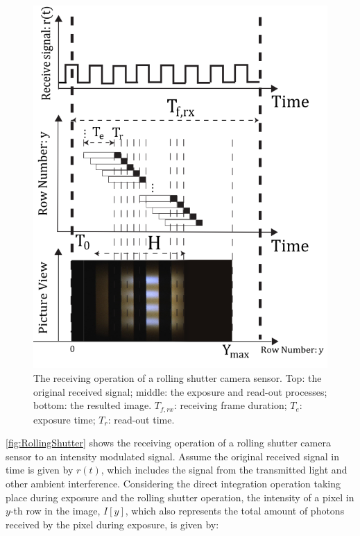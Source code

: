 \begin{figure}[!htb]
	\includegraphics[scale=0.35]{fig/RollingShutter2}
	\caption{The receiving operation of a rolling shutter camera sensor. Top: the original received signal; middle: the exposure and read-out processes; bottom: the resulted image. $T_{f,rx}$: receiving frame duration; $T_e$: exposure time; $T_r$: read-out time.}
	\label{fig:RollingShutter}
\end{figure}

\autoref{fig:RollingShutter} shows the receiving operation of a rolling shutter camera sensor to an intensity modulated signal.
Assume the original received signal in time is given by $r(t)$, which includes the signal from the transmitted light and other ambient interference. Considering the direct integration operation taking place during exposure and the rolling shutter operation, the intensity of a pixel in $y$-th row in the image, $I[y]$, which also represents the total amount of photons received by the pixel during exposure, is given by:

